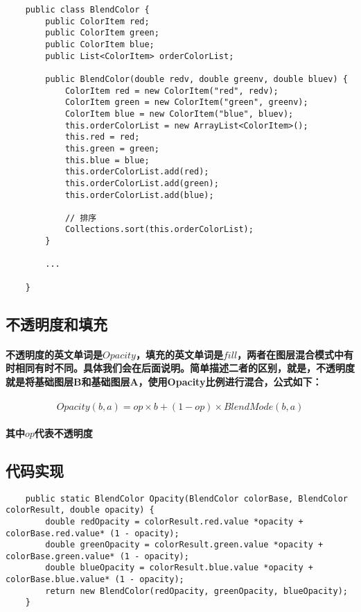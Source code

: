 
\begin{lstlisting}
	public class BlendColor {
		public ColorItem red;
		public ColorItem green;
		public ColorItem blue;
		public List<ColorItem> orderColorList;
		
		public BlendColor(double redv, double greenv, double bluev) {
			ColorItem red = new ColorItem("red", redv);
			ColorItem green = new ColorItem("green", greenv);
			ColorItem blue = new ColorItem("blue", bluev);
			this.orderColorList = new ArrayList<ColorItem>();
			this.red = red;
			this.green = green;
			this.blue = blue;
			this.orderColorList.add(red);
			this.orderColorList.add(green);
			this.orderColorList.add(blue);
			
			// 排序
			Collections.sort(this.orderColorList);
		}
		
		...
		
	}
\end{lstlisting}


\subsection{ 不透明度和填充}

\paragraph{不透明度的英文单词是$Opacity$，填充的英文单词是$fill$，两者在图层混合模式中有时相同有时不同。具体我们会在后面说明。简单描述二者的区别，就是，不透明度就是将基础图层B和基础图层A，使用Opacity比例进行混合，公式如下：}
\paragraph{$$Opacity(b,a)= op\times b + (1-op)\times BlendMode(b,a)$$}
\paragraph{其中$op$代表不透明度}
\subsection{ 代码实现}
\begin{lstlisting}
	public static BlendColor Opacity(BlendColor colorBase, BlendColor colorResult, double opacity) {
		double redOpacity = colorResult.red.value *opacity + colorBase.red.value* (1 - opacity);
		double greenOpacity = colorResult.green.value *opacity + colorBase.green.value* (1 - opacity);
		double blueOpacity = colorResult.blue.value *opacity + colorBase.blue.value* (1 - opacity);
		return new BlendColor(redOpacity, greenOpacity, blueOpacity);
	}
\end{lstlisting}
